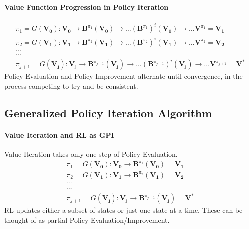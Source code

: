 \documentclass[11pt]{article}
\begin{document}
\paragraph*{Value Function Progression in Policy Iteration}
$$
\begin{gathered}
\pi_1=G\left(\boldsymbol{V}_{\mathbf{0}}\right): \boldsymbol{V}_{\mathbf{0}} \rightarrow \boldsymbol{B}^{\pi_1}\left(\boldsymbol{V}_{\mathbf{0}}\right) \rightarrow \ldots\left(\boldsymbol{B}^{\pi_1}\right)^i\left(\boldsymbol{V}_{\mathbf{0}}\right) \rightarrow \ldots \boldsymbol{V}^{\pi_1}=\boldsymbol{V}_{\mathbf{1}} \\
\pi_2=G\left(\boldsymbol{V}_{\mathbf{1}}\right): \boldsymbol{V}_{\mathbf{1}} \rightarrow \boldsymbol{B}^{\pi_2}\left(\boldsymbol{V}_{\mathbf{1}}\right) \rightarrow \ldots\left(\boldsymbol{B}^{\pi_2}\right)^i\left(\boldsymbol{V}_{\mathbf{1}}\right) \rightarrow \ldots \boldsymbol{V}^{\pi_2}=\boldsymbol{V}_{\mathbf{2}} \\
\ldots \\
\ldots \\
\pi_{j+1}=G\left(\boldsymbol{V}_{\boldsymbol{j}}\right): \boldsymbol{V}_{\boldsymbol{j}} \rightarrow \boldsymbol{B}^{\pi_{j+1}}\left(\boldsymbol{V}_{\boldsymbol{j}}\right) \rightarrow \ldots\left(\boldsymbol{B}^{\pi_{j+1}}\right)^i\left(\boldsymbol{V}_{\boldsymbol{j}}\right) \rightarrow \ldots \boldsymbol{V}^{\pi_{j+1}}=\boldsymbol{V}^*
\end{gathered}
$$
Policy Evaluation and Policy Improvement alternate until convergence, in the process competing to try and be consistent. 


\subsection*{Generalized Policy Iteration Algorithm}
\paragraph*{Value Iteration and RL as GPI}
Value Iteration takes only one step of Policy Evaluation. 
$$
\begin{gathered}
\pi_1=G\left(\mathbf{V}_{\mathbf{0}}\right): \mathbf{V}_{\mathbf{0}} \rightarrow \boldsymbol{B}^{\pi_1}\left(\mathbf{V}_{\mathbf{0}}\right)=\mathbf{V}_{\mathbf{1}} \\
\pi_2=G\left(\mathbf{V}_{\mathbf{1}}\right): \mathbf{V}_{\mathbf{1}} \rightarrow \boldsymbol{B}^{\pi_2}\left(\mathbf{V}_{\mathbf{1}}\right)=\mathbf{V}_{\mathbf{2}} \\
\cdots \\
\cdots \\
\pi_{j+1}=G\left(\boldsymbol{V}_{\boldsymbol{j}}\right): \boldsymbol{V}_{\boldsymbol{j}} \rightarrow \boldsymbol{B}^{\pi_{j+1}}\left(\mathbf{V}_{\boldsymbol{j}}\right)=\mathbf{V}^*
\end{gathered}
$$
RL updates either a subset of states or just one state at a time. These can be thought of as partial Policy Evaluation/Improvement.
\end{document}
